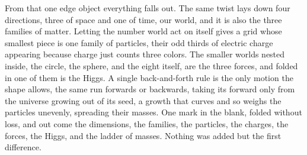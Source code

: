 From that one edge object everything falls out. The same twist lays down four directions, three of space and one of
time, our world, and it is also the three families of matter. Letting the number world act on itself gives a grid whose
smallest piece is one family of particles, their odd thirds of electric charge appearing because charge just counts
three colors. The smaller worlds nested inside, the circle, the sphere, and the eight itself, are the three forces, and
folded in one of them is the Higgs. A single back-and-forth rule is the only motion the shape allows, the same run
forwards or backwards, taking its forward only from the universe growing out of its seed, a growth that curves and so
weighs the particles unevenly, spreading their masses. One mark in the blank, folded without loss, and out come the
dimensions, the families, the particles, the charges, the forces, the Higgs, and the ladder of masses. Nothing was
added but the first difference.
